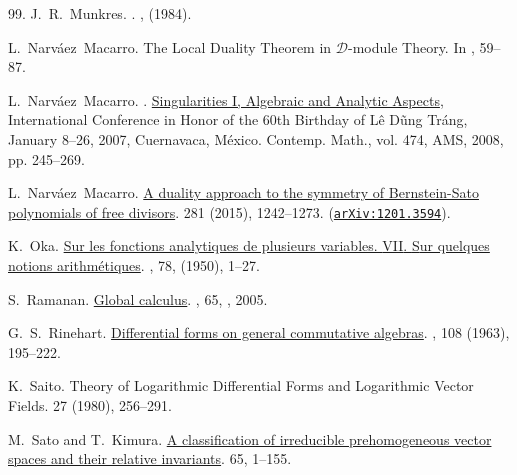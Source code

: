 \documentclass[12pt]{article}
\newcommand{\DD}{\mathcal{D}}
\begin{document}
\begin{thebibliography}{99.}
 {J.~R.~Munkres}.
.
, {(1984)}.

L.~Narv\'{a}ez~Macarro.
\newblock The Local Duality Theorem in $\DD$-module Theory.
In \cite{cimpa-2}, 59--87.

L.~Narv\'{a}ez~Macarro.
.
\newblock \href{{https://doi.org/10.1090/conm/474/09259}}{Singularities I, Algebraic and Analytic Aspects}, International Conference in Honor of the 60th Birthday of L\^e D\~ung
Tr\'ang, January 8–26, 2007, Cuernavaca, M{\'e}xico. Contemp. Math., vol. 474, AMS, 2008, pp. 245--269.

L.~Narv\'{a}ez~Macarro.
\newblock \href{https://doi.org/10.1016/j.aim.2015.06.012}{A duality approach to the symmetry of Bernstein-Sato polynomials of free divisors}.
 281 (2015), 1242--1273.
\newblock (\href{https://arxiv.org/abs/1201.3594}{\tt  arXiv:1201.3594}).

K.~Oka.
\newblock \href{http://www.numdam.org/item?id=BSMF_1950__78__1_0}{Sur les fonctions analytiques de plusieurs variables. {VII}. {S}ur quelques notions arithm\'{e}tiques}.
, {78}, {(1950)}, {1--27}.

 {S.~Ramanan.}
\newblock \href{https://doi.org/10.1090/gsm/065}{Global calculus}.
, {65},
, {2005}.

{ G.~S.~Rinehart.}
\newblock  \href{https://doi.org/10.2307/1993603}{Differential forms on general commutative algebras}.
, 108 (1963), 195--222.

 K.~Saito. \newblock Theory of Logarithmic Differential
Forms and Logarithmic Vector Fields.
 27 (1980), 256--291.



 M.~Sato and T.~Kimura.
\newblock \href{http://projecteuclid.org/euclid.nmj/1118796150}{A classification of irreducible prehomogeneous vector spaces and their relative invariants}.
 65, 1--155.



\end{thebibliography}
\end{document}
